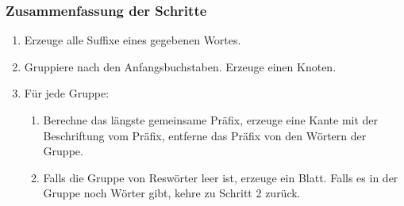 \documentclass{beamer}
\begin{document}
\begin{frame}[t]
\begin{figure}
\end{figure}
\end{frame}

\begin{frame}[t]
\frametitle{Zusammenfassung der Schritte}
\begin{enumerate}
    \item Erzeuge alle Suffixe eines gegebenen Wortes.
    \item Gruppiere nach den Anfangsbuchstaben. Erzeuge einen Knoten.
    \item Für jede Gruppe:
    \begin{enumerate}
        \item Berechne das längste gemeinsame Präfix, erzeuge eine Kante mit der Beschriftung vom Präfix, entferne das Präfix von den Wörtern der Gruppe.
        \item Falls die Gruppe von Reswörter leer ist, erzeuge ein Blatt. Falls es in der Gruppe noch Wörter gibt, kehre zu Schritt 2 zurück.
    \end{enumerate}
\end{enumerate}
\end{frame}
\end{document}
